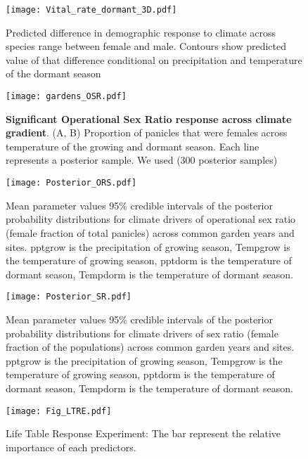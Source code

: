 \documentclass[9pt,twoside,lineno]{pnas-new}
\newcommand{\revise}[1]{{\color{Mahogany}{#1}}}
\begin{document}
\begin{figure}
\centering
\texttt{[image: Vital\_rate\_dormant\_3D.pdf]}
\caption{ Predicted difference in demographic response to climate across species range between female and male. Contours show predicted value of that difference conditional on precipitation and temperature of the dormant  season }
\label{Sup:vt_3D_dorm}
\end{figure}
\clearpage

\begin{figure}
\centering
\texttt{[image: gardens\_OSR.pdf]}
\caption{\textbf{Significant Operational Sex Ratio response across climate gradient}.
			(A, B) Proportion of panicles that were females across  temperature of the growing and dormant season.
			Each line represents a  posterior sample. We used (300 posterior samples) }
\label{Sup:gardens_OSR}
\end{figure}
\clearpage

\begin{figure}
\centering
\texttt{[image: Posterior\_ORS.pdf]}
\caption{Mean parameter values\revise{, 50\% and} 95\% credible intervals of the posterior probability distributions for climate drivers of operational sex ratio (female fraction of total panicles) across common garden years and sites. 
		pptgrow is  the precipitation of growing season,
		Tempgrow is the temperature of growing season,
		pptdorm is the temperature of dormant season,
		Tempdorm is the temperature of dormant season.}
\label{Sup:posterior_OSR}
\end{figure}
\clearpage

\begin{figure}
\centering
\texttt{[image: Posterior\_SR.pdf]}
\caption{Mean parameter values\revise{, 50\% and} 95\% credible intervals of the posterior probability distributions for climate drivers of sex ratio (female fraction of the populations) across common garden years and sites. 
			pptgrow is  the precipitation of growing season,
			Tempgrow is the temperature of growing season,
			pptdorm is the temperature of dormant season,
			Tempdorm is the temperature of dormant season.
			}
\label{Sup:posterior_SR}
\end{figure}
\clearpage


\begin{figure}
\centering
\texttt{[image: Fig\_LTRE.pdf]}
\caption{Life Table Response Experiment: The bar represent the relative importance of each predictors.}
\label{Sup:LTRE}
\end{figure}
\clearpage
\end{document}
